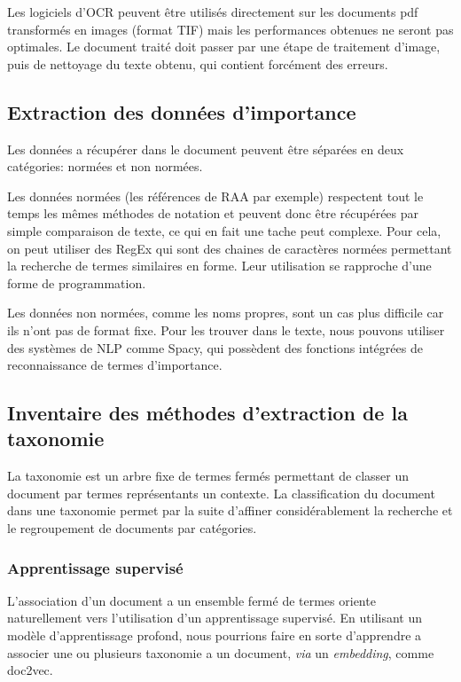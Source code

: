 Les logiciels d'OCR peuvent être utilisés directement sur les documents pdf transformés en images (format TIF) mais les performances obtenues ne seront pas optimales.
Le document traité doit passer par une étape de traitement d'image, puis de nettoyage du texte obtenu, qui contient forcément des erreurs.

\subsection{Extraction des données d'importance}
Les données a récupérer dans le document peuvent être séparées en deux catégories: normées et non normées.

Les données normées (les références de RAA par exemple) respectent tout le temps les mêmes méthodes de notation et peuvent donc être récupérées par simple comparaison de texte, ce qui en fait une tache peut complexe.
Pour cela, on peut utiliser des RegEx qui sont des chaines de caractères normées permettant la recherche de termes similaires en forme.
Leur utilisation se rapproche d'une forme de programmation.

Les données non normées, comme les noms propres, sont un cas plus difficile car ils n'ont pas de format fixe.
Pour les trouver dans le texte, nous pouvons utiliser des systèmes de \gls{NLP} comme Spacy, qui possèdent des fonctions intégrées de reconnaissance de termes d'importance.


\subsection{Inventaire des méthodes d'extraction de la taxonomie}
La taxonomie est un arbre fixe de termes fermés permettant de classer un document par termes représentants un contexte.
La classification du document dans une taxonomie permet par la suite d'affiner considérablement la recherche et le regroupement de documents par catégories.

\subsubsection{Apprentissage supervisé}
L'association d'un document a un ensemble fermé de termes oriente naturellement vers l'utilisation d'un apprentissage supervisé.
En utilisant un modèle d'apprentissage profond, nous pourrions faire en sorte d'apprendre a associer une ou plusieurs taxonomie a un document, \textit{via} un \textit{embedding}, comme doc2vec\cite{doc2vec}.

